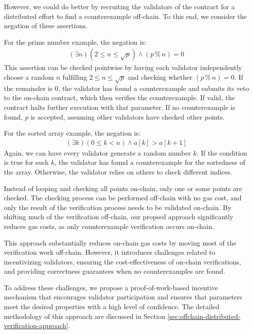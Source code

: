 \documentclass[runningheads]{llncs}
\begin{document}
However, we could do better by recruiting the validators of the contract for a distributed effort to find a counterexample off-chain. To this end, we consider the negation of these assertions. 

For the prime number example, the negation is:
\begin{gather*}\label{}
  (\exists n) (2 \leq n \leq \sqrt{p}) \wedge (p \mathbin{\%} n) = 0
\end{gather*}
This assertion can be checked pointwise by having each validator independently choose a random \(n\) fulfilling \(2 \leq n \leq \sqrt{p}\) and checking whether \((p \mathbin{\%} n) = 0\). If the remainder is \(0\), the validator has found a counterexample and submits its veto to the on-chain contract, which then verifies the counterexample. If valid, the contract halts further execution with that parameter. If no counterexample is found, \(p\) is accepted, assuming other validators have checked other points.

For the sorted array example, the negation is:
\begin{gather*}\label{}
  (\exists k) (0\leq k <n) \wedge a[k] > a[k+1]
\end{gather*}
Again, we can have every validator generate a random number \(k\). If the condition is true for such \(k\), the validator has found a counterexample for the sortedness of the array. Otherwise, the validator relies on others to check different indices.

Instead of looping and checking all points on-chain, only one or some points are checked. The checking process can be performed off-chain with no gas cost, and only the result of the verification process needs to be validated on-chain. By shifting much of the verification off-chain, our propsed approach significantly reduces gas costs, as only counterexample verification occurs on-chain.

This approach substantially reduces on-chain gas costs by moving most of the verification work off-chain. However, it introduces challenges related to incentivizing validators, ensuring the cost-effectiveness of on-chain verifications, and providing correctness guarantees when no counterexamples are found.

To address these challenges, we propose a proof-of-work-based incentive mechanism that encourages validator participation and ensures that parameters meet the desired properties with a high level of confidence. The detailed methodology of this approach are discussed in Section \ref{sec:offchain-distributed-verification-approach}.
\end{document}

